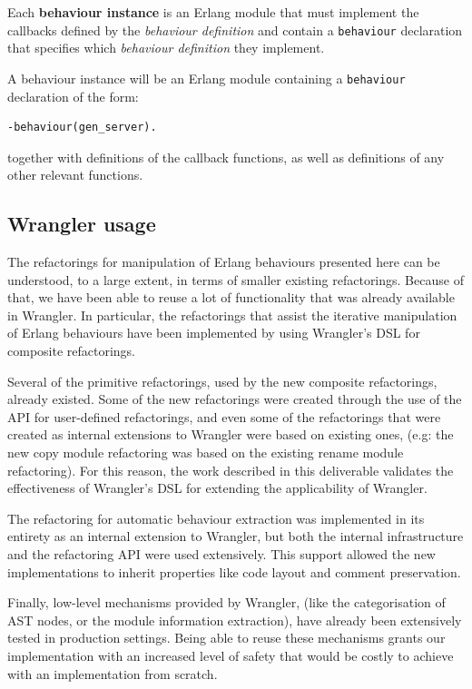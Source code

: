 Each \textbf{behaviour instance} is an Erlang module that must implement the callbacks
defined by the \emph{behaviour definition} and contain a \texttt{behaviour}
declaration that specifies which \emph{behaviour definition} they
implement. 

A behaviour instance will be an Erlang module containing a \texttt{behaviour} declaration of the form:\begin{verbatim}
-behaviour(gen_server).
\end{verbatim}
together with definitions of the callback functions, as well as definitions of any other relevant functions.

\subsection{Wrangler usage}\label{wrangler-usage}

The refactorings for manipulation of Erlang behaviours presented here can be understood, to a large extent, in terms of 
smaller existing refactorings. Because of that, we have been able to reuse a lot of functionality that was already 
available in Wrangler. In particular, the refactorings that assist the iterative manipulation of Erlang behaviours have 
been implemented by using Wrangler's DSL for composite refactorings.

Several of the primitive refactorings, used by the new composite refactorings, already existed. Some of the 
new refactorings were created through the use of the API for user-defined refactorings, and even some of the 
refactorings that were created as internal extensions to Wrangler were based on existing ones, (e.g: the new copy 
module refactoring was based on the existing rename module refactoring). For this reason, the work described in this 
deliverable validates the effectiveness of Wrangler's DSL for extending the applicability of Wrangler.

The refactoring for automatic behaviour extraction was implemented in its entirety as an internal extension to 
Wrangler, but both the internal infrastructure and the refactoring API were used extensively. This support allowed the 
new implementations to inherit properties like code layout and comment preservation.

Finally, low-level mechanisms provided by Wrangler, (like the categorisation of AST nodes, or the module information 
extraction), have already been extensively tested in production settings. Being able to reuse these mechanisms grants 
our implementation with an increased level of safety that would be costly to achieve with an implementation from 
scratch.

